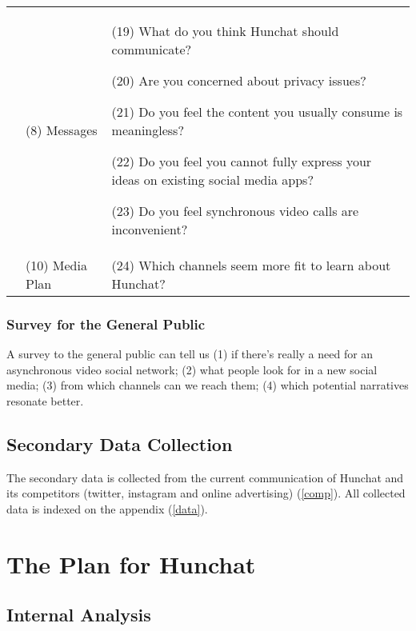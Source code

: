 \documentclass[12pt]{article}
\begin{document}
\begin{table}[htb]
\begin{tabular}{ @{}P{0.15\textwidth}P{0.2\textwidth}P{0.6\textwidth}@{} }
	& (8) Messages &  (19) What do you think Hunchat should communicate? \par (20) Are you concerned about privacy issues? \par (21) Do you feel the content you usually consume is meaningless? \par (22) Do you feel you cannot fully express your ideas on existing social media apps? \par (23) Do you feel synchronous video calls are inconvenient?  \\
                                   & (10) Media Plan        & (24) Which channels seem more fit to learn about Hunchat?                                                                                                                                                                                                                                                                                                       \\ \hline
\end{tabular}
\end{table}

\subsubsection{Survey for the General Public}
A survey to the general public can tell us (1) if there's really a need for an asynchronous video social network; (2) what people look for in a new social media; (3) from which channels can we reach them; (4) which potential narratives resonate better.

\subsection{Secondary Data Collection}
The secondary data is collected from the current communication of Hunchat and its competitors (twitter, instagram and online advertising) (\ref{comp}). All collected data is indexed on the appendix (\ref{data}).

\section{The Plan for Hunchat}\label{plan}



\subsection{Internal Analysis}
\end{document}
